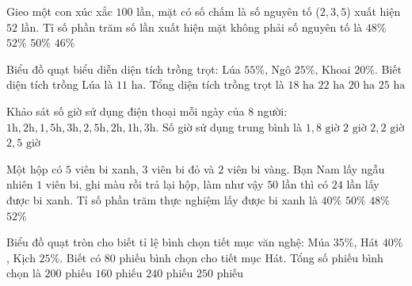 \begin{ex} %
Gieo một con xúc xắc $100$ lần, mặt có số chấm là số nguyên tố ($2, 3, 5$) xuất hiện $52$ lần. Tỉ số phần trăm số lần xuất hiện mặt không phải số nguyên tố là
\choice
{\True $48\%$}
{$52\%$}
{$50\%$}
{$46\%$}
\end{ex}

\begin{ex} %
Biểu đồ quạt biểu diễn diện tích trồng trọt: Lúa $55\%$, Ngô $25\%$, Khoai $20\%$. Biết diện tích trồng Lúa là $11\text{ ha}$. Tổng diện tích trồng trọt là
\choice
{$18\text{ ha}$}
{$22\text{ ha}$}
{\True $20\text{ ha}$}
{$25\text{ ha}$}
\end{ex}

\begin{ex} %
Khảo sát số giờ sử dụng điện thoại mỗi ngày của $8$ người: $1\text{h}, 2\text{h}, 1{,}5\text{h}, 3\text{h}, 2{,}5\text{h}, 2\text{h}, 1\text{h}, 3\text{h}$. Số giờ sử dụng trung bình là
\choice
{$1{,}8\text{ giờ}$}
{\True $2\text{ giờ}$}
{$2{,}2\text{ giờ}$}
{$2{,}5\text{ giờ}$}
\end{ex}

\begin{ex} %
Một hộp có $5$ viên bi xanh, $3$ viên bi đỏ và $2$ viên bi vàng. Bạn Nam lấy ngẫu nhiên $1$ viên bi, ghi màu rồi trả lại hộp, làm như vậy $50$ lần thì có $24$ lần lấy được bi xanh. Tỉ số phần trăm thực nghiệm lấy được bi xanh là
\choice
{$40\%$}
{$50\%$}
{\True $48\%$}
{$52\%$}
\end{ex}

\begin{ex} %
Biểu đồ quạt tròn cho biết tỉ lệ bình chọn tiết mục văn nghệ: Múa $35\%$, Hát $40\%$, Kịch $25\%$. Biết có $80$ phiếu bình chọn cho tiết mục Hát. Tổng số phiếu bình chọn là
\choice
{\True $200$ phiếu}
{$160$ phiếu}
{$240$ phiếu}
{$250$ phiếu}
\end{ex}

